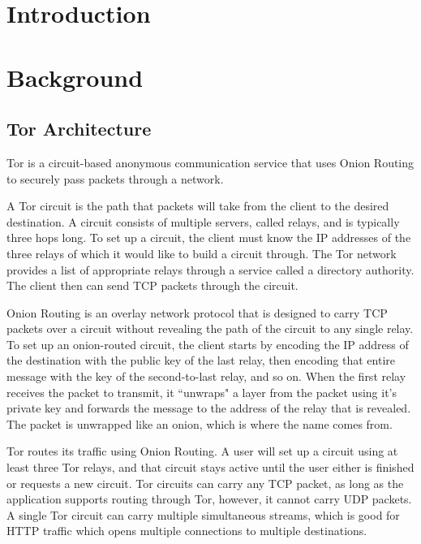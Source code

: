 \documentclass[12pt,journal]{IEEEtran}
\providecommand{\keywords}[1]{\textbf{Keywords} #1}
\begin{document}

\section{Introduction}
\section{Background}
\subsection{Tor Architecture}
Tor is a circuit-based anonymous communication service that uses Onion Routing to securely pass packets through a network.
\par
A Tor circuit is the path that packets will take from the client to the desired destination. A circuit consists of multiple servers, called relays, and is typically three hops long. To set up a circuit, the client must know the IP addresses of the three relays of which it would like to build a circuit through. The Tor network provides a list of appropriate relays through a service called a directory authority. The client then can send TCP packets through the circuit.
\par
Onion Routing is an overlay network protocol that is designed to carry TCP packets over a circuit without revealing the path of the circuit to any single relay. To set up an onion-routed circuit, the client starts by encoding the IP address of the destination with the public key of the last relay, then encoding that entire message with the key of the second-to-last relay, and so on. When the first relay receives the packet to transmit, it ``unwraps" a layer from the packet using it's private key and forwards the message to the address of the relay that is revealed. The packet is unwrapped like an onion, which is where the name comes from.
\par
Tor routes its traffic using Onion Routing. A user will set up a circuit using at least three Tor relays, and that circuit stays active until the user either is finished or requests a new circuit. Tor circuits can carry any TCP packet, as long as the application supports routing through Tor, however, it cannot carry UDP packets. A single Tor circuit can carry multiple simultaneous streams, which is good for HTTP traffic which opens multiple connections to multiple destinations.
\end{document}
